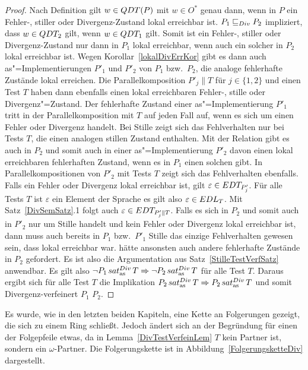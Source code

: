 \begin{proof}
  Nach Definition gilt $w\in QDT (P)$ mit $w\in O^*$ genau dann, wenn in $P$
  ein Fehler-, stiller oder Divergenz-Zustand lokal erreichbar ist. $P_1 \sqsubseteq  _{Div}
  P_2$ impliziert, dass $w\in QDT _2$ gilt, wenn $w\in QDT _1$ gilt. Somit ist
  ein Fehler-, stiller oder Divergenz-Zustand nur dann in $P_1$ lokal
  erreichbar, wenn auch ein solcher in $P_2$ lokal erreichbar ist. Wegen
  Korollar~\ref{lokalDivErrKor} gibt es dann auch as"=Implementierungen $P'_1$
  und $P'_2$ von $P_1$ bzw.\ $P_2$, die analoge fehlerhafte Zustände lokal
  erreichen. Die Parallelkomposition $P'_j\|T$ für $j\in \{1,2\}$ und einen
  Test $T$ haben dann ebenfalls einen lokal erreichbaren Fehler-, stille oder
  Divergenz"=Zustand. Der fehlerhafte Zustand einer as"=Implementierung $P'_1$
  tritt in der Parallelkomposition mit $T$ auf jeden Fall auf, wenn es sich um
  einen Fehler oder Divergenz handelt. Bei Stille zeigt sich das Fehlverhalten
  nur bei Tests $T$, die einen analogen stillen Zustand enthalten. Mit der
  Relation \DRel{} gibt es auch in $P_2$ und somit auch in einer
  as"=Implementierung $P'_2$ davon einen lokal erreichbaren fehlerhaften
  Zustand, wenn es in $P_1$ einen solchen gibt. In Parallelkompositionen von
  $P'_2$ mit Tests $T$ zeigt sich das Fehlverhalten ebenfalls. Falls ein Fehler
  oder Divergenz lokal erreichbar ist, gilt $\varepsilon \in EDT _{P'_j}$. Für
  alle Tests $T$ ist $\varepsilon$ ein Element der Sprache es gilt also
  $\varepsilon \in EDL _T$. Mit Satz~\ref{DivSemSatz}.1 folgt auch
  $\varepsilon \in EDT _{P'_j\|T}$. Falls es sich in $P_2$ und somit auch in
  $P'_2$ nur um Stille handelt und kein Fehler oder Divergenz lokal erreichbar
  ist, dann muss auch bereits in $P_1$ bzw.\ $P'_1$ Stille das einzige
  Fehlverhalten gewesen sein, dass lokal erreichbar war. \DRel{} hätte
  ansonsten auch andere fehlerhafte Zustände in $P_2$ gefordert. Es ist also
  die Argumentation aus Satz~\ref{StilleTestVerfSatz} anwendbar. Es gilt also
  $\neg P_1 \hspace{0.05cm}sat_\mathrm{as}^{Div}\hspace{0.05cm} T \Rightarrow \neg P_2 \hspace{0.05cm}sat_\mathrm{as}^{Div}\hspace{0.05cm} T$ für alle Test $T$. Daraus
  ergibt sich für alle Test $T$ die Implikation $P_2 \hspace{0.05cm}sat_\mathrm{as}^{Div}\hspace{0.05cm} T \Rightarrow P_2
  \hspace{0.05cm}sat_\mathrm{as}^{Div}\hspace{0.05cm} T$ und somit Divergenz-verfeinert $P_1$ $P_2$.
\end{proof}

Es wurde, wie in den letzten beiden Kapiteln, eine Kette an Folgerungen
gezeigt, die sich zu einem Ring schließt. Jedoch ändert sich an der Begründung
für einen der Folgepfeile etwas, da in Lemma~\ref{DivTestVerfeinLem} $T$ kein
Partner ist, sondern ein $\omega$-Partner. Die Folgerungskette ist in
Abbildung~\ref{FolgerungsketteDiv} dargestellt.

